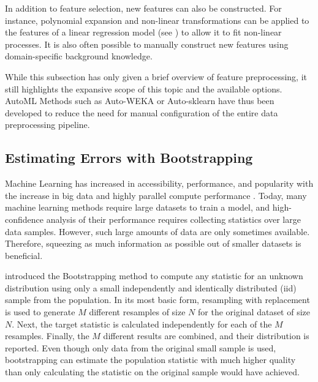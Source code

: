In addition to feature selection, new features can also be constructed. For instance, polynomial expansion and non-linear transformations can be applied to the features of a linear regression model (see ) to allow it to fit non-linear processes. It is also often possible to manually construct new features using domain-specific background knowledge.

\newpar While this subsection has only given a brief overview of feature preprocessing, it still highlights the expansive scope of this topic and the available options. AutoML Methods such as Auto-WEKA \cite{automl-2013} or Auto-sklearn \cite{auto-sklearn-2019} have thus been developed to reduce the need for manual configuration of the entire data preprocessing pipeline.

\subsection{Estimating Errors with Bootstrapping} \label{txt:bootstrapping}

Machine Learning has increased in accessibility, performance, and popularity with the increase in big data and highly parallel compute performance \cite{ml-trends-2021}. Today, many machine learning methods require large datasets to train a model, and high-confidence analysis of their performance requires collecting statistics over large data samples. However, such large amounts of data are only sometimes available. Therefore, squeezing as much information as possible out of smaller datasets is beneficial.

\newpar \textcite{bootstrapping-1979} introduced the Bootstrapping method to compute any statistic for an unknown distribution using only a small independently and identically distributed (iid) sample from the population. In its most basic form, resampling with replacement is used to generate $M$ different resamples of size $N$ for the original dataset of size $N$. Next, the target statistic is calculated independently for each of the $M$ resamples. Finally, the $M$ different results are combined, and their distribution is reported. Even though only data from the original small sample is used, bootstrapping can estimate the population statistic with much higher quality than only calculating the statistic on the original sample would have achieved.

